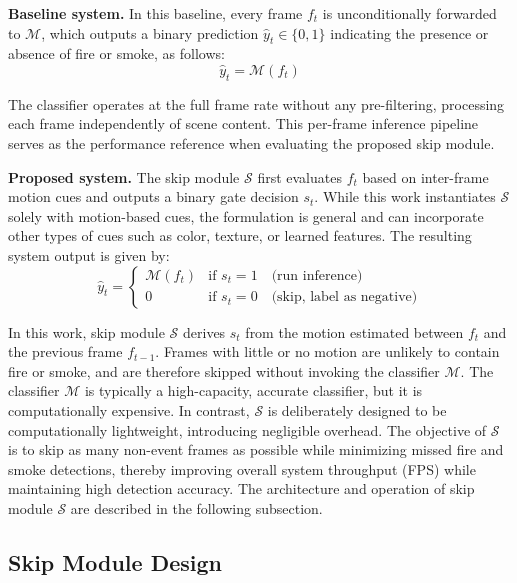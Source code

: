 \documentclass[final,3p,times,twocolumn]{elsarticle}
\begin{document}
\textbf{Baseline system.} In this baseline, every frame $f_t$ is
unconditionally forwarded to $\mathcal{M}$, which outputs a binary
prediction $\hat{y}_t \in \{0, 1\}$ indicating the presence or absence
of fire or smoke, as follows:
\begin{equation}
\hat{y}_t = \mathcal{M}(f_t)
\end{equation}

The classifier operates at the full frame rate without any
pre-filtering, processing each frame independently of scene content.
This per-frame inference pipeline serves as the performance reference
when evaluating the proposed skip module.

\textbf{Proposed system.} The skip module $\mathcal{S}$ first evaluates
$f_t$ based on inter-frame motion cues and outputs a binary gate
decision $s_t$. While this work instantiates $\mathcal{S}$ solely with
motion-based cues, the formulation is general and can incorporate other
types of cues such as color, texture, or learned features. The
resulting system output is given by:
\begin{equation}
\hat{y}_t = \begin{cases} \mathcal{M}(f_t) & \text{if } s_t = 1 \quad
\text{(run inference)} \\ 0 & \text{if } s_t = 0 \quad \text{(skip, label as
negative)} \end{cases}
\end{equation}

In this work, skip module $\mathcal{S}$ derives $s_t$ from the motion
estimated between $f_t$ and the previous frame $f_{t-1}$. Frames with
little or no motion are unlikely to contain fire or smoke, and are
therefore skipped without invoking the classifier $\mathcal{M}$. The
classifier $\mathcal{M}$ is typically a high-capacity, accurate
classifier, but it is computationally expensive. In contrast,
$\mathcal{S}$ is deliberately designed to be computationally
lightweight, introducing negligible overhead. The objective of
$\mathcal{S}$ is to skip as many non-event frames as possible while
minimizing missed fire and smoke detections, thereby improving overall
system throughput (FPS) while maintaining high detection accuracy. The
architecture and operation of skip module $\mathcal{S}$ are described in
the following subsection.

\subsection{Skip Module Design}\label{skip-module-design}
\end{document}
